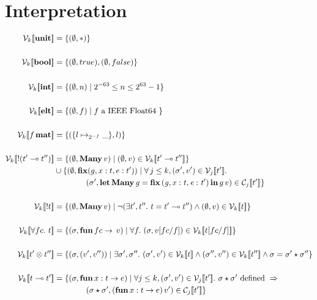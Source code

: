 \section{Interpretation}

\begin{align*}
  \V{k}{ \Unit } &= \{ (\empH, \ast) \} \\
\\
    \V{k}{ \Bool } &= \{ (\empH, true), (\empH, false) \} \\
\\
    \V{k}{ \Int } &= \{ (\empH, n) \mid 2^{-63} \leq n \leq 2^{63} -1 \} \\
\\
    \V{k}{ \Elt } &= \{ (\empH, f) \mid f \textrm{ a IEEE Float64 } \} \\
\\
    \V{k}{ f \, \Mat } &= \{ (\{ l \mapsto_{2^{-f}} \_ \} , l) \} \\
\\
    \V{k}{ \Bang (t' \multimap t'') } &= \{ (\empH, \Many\, v) \mid (\empH, v) \in \V{k}{ t' \multimap t'' } \} \\
                                      & \cup \{ (\empH, \ottkw{fix} (g, x : t, e : t')) \mid \forall \, j \leq k, (\sigma', v') \in \V{j}{ t' }.\\
                                      & \qquad \qquad (\sigma', \letManyG v) \in \C{j}{ t' } \} \\
\\
    \V{k}{ \Bang t } &= \{ (\empH, \Many\, v) \mid \neg (\exists t', t''.\ t = t' \multimap t'') \wedge (\empH, v) \in \V{k}{t} \} \\
\\
    \V{k}{ \forall fc.\  t } &= \{ (\sigma, \ottkw{fun}\, fc \rightarrow \, v) \mid \forall f.\ (\sigma, v [ fc / f ]) \in \V{k}{ t [ fc / f ] } \} \\
\\
    \V{k}{ t' \otimes t'' } &= \{ (\sigma, ( v', v'' )) \mid \exists \sigma', \sigma'' .\ (\sigma', v') \in \V{k}{ t } \wedge (\sigma'', v'') \in \V{k}{ t''} \wedge \sigma = \sigma' \star \sigma'' \} \\
\\
    \V{k}{ t \multimap t' } &= \{ (\sigma, \ottkw{fun}\, x : t \rightarrow e) \mid \forall j \leq k, (\sigma', v') \in \V{j}{ t' }.\ \sigma \star \sigma' \textrm{ defined } \Rightarrow \\
                            & \qquad \qquad (\sigma \star \sigma', (\ottkw{fun}\, x : t \rightarrow e)\, v') \in \C{j}{ t' } \} \\

\end{align*}
